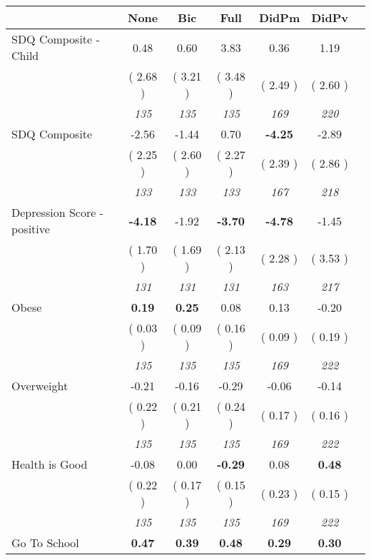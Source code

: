 \begin{tabular}{l c c c c c c}
\toprule
 & None & Bic & Full & DidPm & DidPv \\
\midrule
SDQ Composite - Child &      0.48 &      0.60 &      3.83 &      0.36 &      1.19 \\
& (     2.68 ) & (     3.21 ) & (     3.48 ) & (     2.49 ) & (     2.60 ) \\
& \textit{ 135 } & \textit{ 135 } & \textit{ 135 } & \textit{ 169 } & \textit{ 220 } \\
SDQ Composite &     -2.56 &     -1.44 &      0.70 & \textbf{     -4.25 } &     -2.89 \\
& (     2.25 ) & (     2.60 ) & (     2.27 ) & (     2.39 ) & (     2.86 ) \\
& \textit{ 133 } & \textit{ 133 } & \textit{ 133 } & \textit{ 167 } & \textit{ 218 } \\
Depression Score - positive & \textbf{     -4.18 } &     -1.92 & \textbf{     -3.70 } & \textbf{     -4.78 } &     -1.45 \\
& (     1.70 ) & (     1.69 ) & (     2.13 ) & (     2.28 ) & (     3.53 ) \\
& \textit{ 131 } & \textit{ 131 } & \textit{ 131 } & \textit{ 163 } & \textit{ 217 } \\
Obese & \textbf{      0.19 } & \textbf{      0.25 } &      0.08 &      0.13 &     -0.20 \\
& (     0.03 ) & (     0.09 ) & (     0.16 ) & (     0.09 ) & (     0.19 ) \\
& \textit{ 135 } & \textit{ 135 } & \textit{ 135 } & \textit{ 169 } & \textit{ 222 } \\
Overweight &     -0.21 &     -0.16 &     -0.29 &     -0.06 &     -0.14 \\
& (     0.22 ) & (     0.21 ) & (     0.24 ) & (     0.17 ) & (     0.16 ) \\
& \textit{ 135 } & \textit{ 135 } & \textit{ 135 } & \textit{ 169 } & \textit{ 222 } \\
Health is Good &     -0.08 &      0.00 & \textbf{     -0.29 } &      0.08 & \textbf{      0.48 } \\
& (     0.22 ) & (     0.17 ) & (     0.15 ) & (     0.23 ) & (     0.15 ) \\
& \textit{ 135 } & \textit{ 135 } & \textit{ 135 } & \textit{ 169 } & \textit{ 222 } \\
Go To School & \textbf{      0.47 } & \textbf{      0.39 } & \textbf{      0.48 } & \textbf{      0.29 } & \textbf{      0.30 } \\

\end{tabular}
